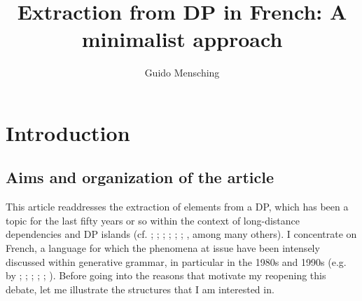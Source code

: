 \documentclass[output=paper]{langsci/langscibook}
\author{Guido Mensching\affiliation{Georg-August-Universität Göttingen}}
\title{Extraction from DP in French: A minimalist approach}
\begin{document}
\section{Introduction}%

\subsection{Aims and organization of the article}%

This article readdresses the extraction of elements from a DP, which has been a topic for the last fifty years or so within the context of long-distance dependencies and DP islands (cf. \citealt{Ross1967}; \citealt{Sportiche1981}; \citealt{Huang1982}; \citealt{Obenauer1985Connectedness,Obenauer1985identification,Obenauer1994}; \citealt{Chomsky1986Barriers}; \citealt{Cinque1990}; \citealt{Szabolcsi2006}, among many others). I concentrate on French, a language for which the phenomena at issue have been intensely discussed within generative grammar, in particular in the 1980s and 1990s (e.g. by \citealt{Tellier1990}; \citealt{Sportiche1981}; \citealt{Obenauer1994}; \citealt{Pollock1989}; \citealt{Valois1991}; \citealt{Godard1992}). Before going into the reasons that motivate my reopening this debate, let me illustrate the structures that I am interested in.

\ea%
    \label{ex:mensch:1}
    \z
\z    
\end{document}
